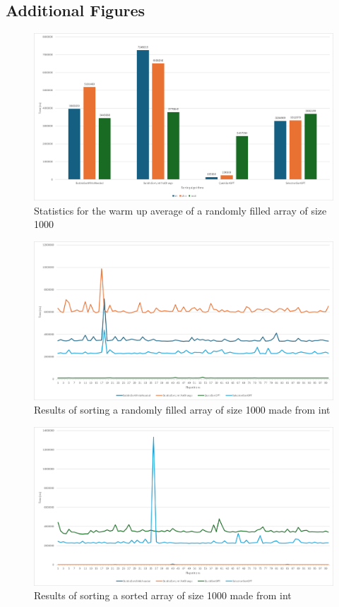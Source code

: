 \documentclass{article}
\begin{document}
    \subsection{Additional Figures}
    \begin{figure}[!h]
        \centering
        \includegraphics[width=0.75\linewidth]{warmup_avg_1000.png}
        \caption{Statistics for the warm up average of a randomly filled array of size 1000}
        \label{fig:warmup_avg_1000_random}
    \end{figure}

    
    \begin{figure}[!h]
        \centering
        \includegraphics[width=0.7\linewidth]{int_1000_random.png}
        \caption{Results of sorting a randomly filled array of size 1000 made from int}
        \label{fig:int_1000_random}
    \end{figure}
    
    \begin{figure}[!h]
        \centering
        \includegraphics[width=0.7\linewidth]{int_1000_sorted.png}
        \caption{Results of sorting a sorted array of size 1000 made from int}
        \label{fig:int_1000_sorted}
    \end{figure}
    
\end{document}
